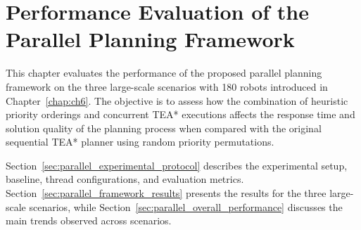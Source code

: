 \chapter{Performance Evaluation of the Parallel Planning Framework}
\label{chap:ch8}
\hspace{\parindent}
This chapter evaluates the performance of the proposed parallel planning framework on the three
large-scale scenarios with 180 robots introduced in Chapter~\ref{chap:ch6}. The objective is to
assess how the combination of heuristic priority orderings and concurrent TEA* executions
affects the response time and solution quality of the planning process when compared
with the original sequential TEA* planner using random priority permutations.

Section~\ref{sec:parallel_experimental_protocol} describes the experimental setup, baseline, thread
configurations, and evaluation metrics. Section~\ref{sec:parallel_framework_results} presents the
results for the three large-scale scenarios, while Section~\ref{sec:parallel_overall_performance}
discusses the main trends observed across scenarios.

